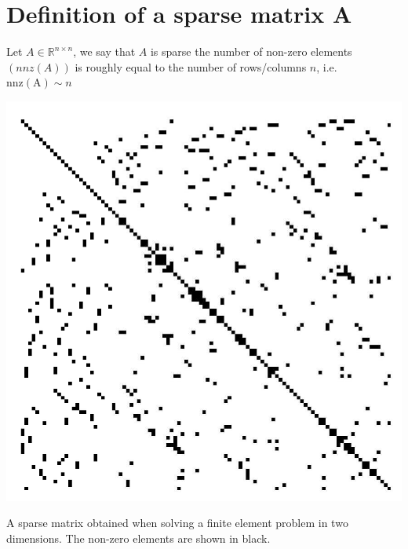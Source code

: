 \documentclass[11pt]{book}
\begin{document}
\section*{Definition of a sparse matrix A}
Let $A \in \mathbb{R}^{n \times n}$, we say that $A$ is sparse the number of non-zero elements $(n n z(A))$ is roughly equal to the number of rows/columns $n$, i.e. $\mathrm{nnz}(\mathrm{A}) \sim n$

\begin{center}
\includegraphics[scale = 0.22,max width=\textwidth]{2023_09_05_b72ccc85584d9dc6fb5cg-030}
\end{center}
A sparse matrix obtained when solving a finite element problem in two dimensions. The non-zero elements are shown in black.
\end{document}
